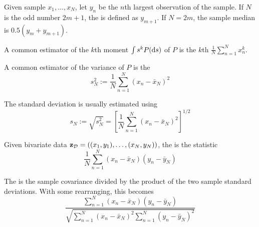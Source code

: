 \begin{frame}

    \vspace{2em}
    \Eg
    Given sample $x_1, \ldots, x_N$, let $y_n$ be the $n$th
    largest observation of the sample.  If $N$ is the odd number $2m+1$,
    the  is defined as $y_{m+1}$.  If $N=2m$,
    the sample median is $0.5(y_m + y_{m+1})$.
        
    \vspace{.7em}    
    \Eg
    A common estimator of the $k$th
    moment $\int s^k P(\mathop{}\!\mathrm{d} s)$ of $P$ is the $k$th 
    $\frac{1}{N} \sum_{n=1}^N x_n^k$.

\end{frame}

\begin{frame}

    \vspace{2em}
    \Eg
    A common estimator of the variance of $P$  is the 
    \begin{equation*}
        \label{eq:sampvar}
        s_N^2 := \frac{1}{N} \sum_{n=1}^N (x_n - \bar x_N)^2
    \end{equation*}
    
    \vspace{.7em}
    The standard deviation is usually estimated using  
    \begin{equation*}
        \label{eq:sampsd}
        s_N 
        := \sqrt{s^2_N} 
        = \left[ 
            \frac{1}{N} \sum_{n=1}^N (x_n - \bar x_N)^2
            \right]^{1/2}
    \end{equation*}
    
\end{frame}

\begin{frame}
    
    \vspace{2em}
    \Eg
    Given bivariate data $\mathbf{z}_{\mathcal D} = ((x_1, y_1), \ldots, (x_N, y_N))$,
    the  is the statistic
    \begin{equation*}
        \label{eq:sampcov}
        \frac{1}{N} \sum_{n=1}^N (x_n - \bar x_N)(y_n - \bar y_N)
    \end{equation*}
    
    \vspace{.7em}
    The  is the sample covariance divided by the 
    product of the two sample standard deviations.  With some rearranging, this becomes
    \begin{equation*}
        \label{eq:sampcorr}
        \frac{\sum_{n=1}^N (x_n - \bar x_N)(y_n - \bar y_N)}
        { 
        \sqrt{ \sum_{n=1}^N (x_n - \bar x_N)^2 \sum_{n=1}^N (y_n - \bar y_N)^2 }
        }
    \end{equation*}
    
\end{frame}

